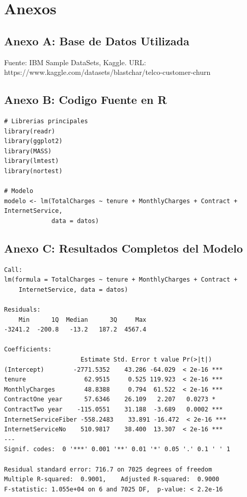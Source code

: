 \documentclass[12pt,a4paper]{article}
\begin{document}
\newpage
\section{Anexos}

\subsection{Anexo A: Base de Datos Utilizada}

Fuente: IBM Sample DataSets, Kaggle.
URL: https://www.kaggle.com/datasets/blastchar/telco-customer-churn

\subsection{Anexo B: Codigo Fuente en R}

\begin{verbatim}
# Librerias principales
library(readr)
library(ggplot2)
library(MASS)
library(lmtest)
library(nortest)

# Modelo
modelo <- lm(TotalCharges ~ tenure + MonthlyCharges + Contract + InternetService,
             data = datos)
\end{verbatim}

\subsection{Anexo C: Resultados Completos del Modelo}

\begin{verbatim}
Call:
lm(formula = TotalCharges ~ tenure + MonthlyCharges + Contract + 
    InternetService, data = datos)

Residuals:
    Min      1Q  Median      3Q     Max 
-3241.2  -200.8   -13.2   187.2  4567.4 

Coefficients:
                     Estimate Std. Error t value Pr(>|t|)    
(Intercept)        -2771.5352    43.286 -64.029  < 2e-16 ***
tenure                62.9515     0.525 119.923  < 2e-16 ***
MonthlyCharges        48.8388     0.794  61.522  < 2e-16 ***
ContractOne year      57.6346    26.109   2.207   0.0273 *  
ContractTwo year    -115.0551    31.188  -3.689   0.0002 ***
InternetServiceFiber -558.2483    33.891 -16.472  < 2e-16 ***
InternetServiceNo    510.9817    38.400  13.307  < 2e-16 ***
---
Signif. codes:  0 '***' 0.001 '**' 0.01 '*' 0.05 '.' 0.1 ' ' 1

Residual standard error: 716.7 on 7025 degrees of freedom
Multiple R-squared:  0.9001,    Adjusted R-squared:  0.9000 
F-statistic: 1.055e+04 on 6 and 7025 DF,  p-value: < 2.2e-16
\end{verbatim}

\end{document}
